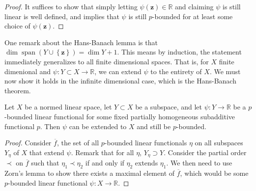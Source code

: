 \documentclass[11pt, letterpaper]{report}
\begin{document}
\begin{proof}
	It suffices to show that simply letting $\psi (\mathbf{z})\in\mathbb{R}$ and claiming $\psi $ is still linear is well defined, and implies that $\psi $ is still $p$-bounded for at least some choice of $\psi (\mathbf{z})$.
\end{proof}
One remark about the Hans-Banach lemma is that $\dim \operatorname{span}(Y\cup \left\{ \mathbf{z} \right\} ) =\dim Y+1$. This means by induction, the statement immediately generalizes to all finite dimensional spaces. That is, for $X$ finite dimenional and $\psi : Y\subset X \to \mathbb{R}$, we can extend $\psi $ to the entirety of $X$. We must now show it holds in the infinite dimensional case, which is the Hans-Banach theorem.
\begin{theorem}\label{thm:2.8}
	Let $X$ be a normed linear space, let $Y\subset X$ be a subspace, and let $\psi : Y \to \mathbb{R}$ be a $p$-bounded linear functional for some fixed partially homogeneous subadditive functional $p$. Then $\psi $ can be extended to $X$ and still be $p$-bounded.
\end{theorem}
\begin{proof}
	Consider $\overline{f} $, the set of all $p$-bounded linear functionals $\eta $ on all subspaces $Y_\eta $ of $X$ that extend $\psi $. Remark that for all $\eta $, $Y_\eta \supset Y$. Consider the partial order $\prec$ on $\overline{f} $ such that $\eta_1\prec \eta_2$ if and only if $\eta_2$ extends $\eta _1$. We then need to use Zorn's lemma to show there exists a maximal element of $\overline{f} $, which would be some $p$-bounded linear functional $\psi : X \to \mathbb{R}$.
\end{proof}
\end{document}
